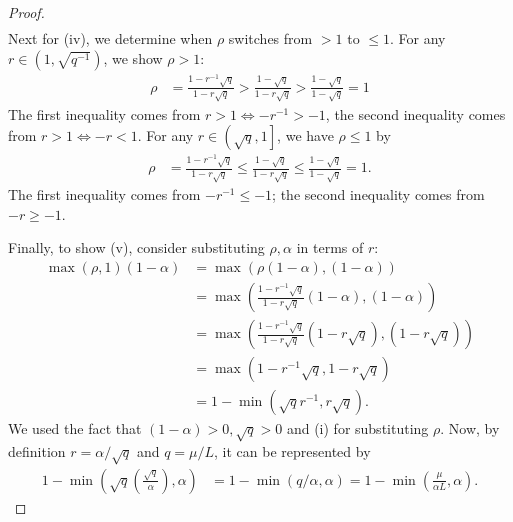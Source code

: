 \documentclass[12pt]{article}
\begin{document}
\begin{proof}
\begin{align*}
        \end{align*}
        Next for (iv), we determine when $\rho$ switches from $> 1$ to $ \le 1$.
        For any $r \in \left(1, \sqrt{q^{-1}}\right)$, we show $\rho > 1$:
        \begin{align*}
            \rho &= \frac{1 - r^{-1}\sqrt{q}}{1 - r \sqrt{q}}
            > \frac{1 - \sqrt{q}}{1 - r \sqrt{q}} > \frac{1 - \sqrt{q}}{1 - \sqrt{q}} = 1
        \end{align*}
        The first inequality comes from $r > 1 \iff -r^{-1} > -1$, the second inequality comes from $r > 1 \iff -r < 1$.
        For any $r \in \left(\sqrt{q}, 1\right]$, we have $\rho \le 1$ by
        \begin{align*}
            \rho &= \frac{1 - r^{-1}\sqrt{q}}{1 - r \sqrt{q}}
            \le \frac{1 - \sqrt{q}}{1 - r \sqrt{q}} \le \frac{1 - \sqrt{q}}{1 - \sqrt{q}} = 1.
        \end{align*}
        The first inequality comes from $-r^{-1} \le - 1$; the second inequality comes from $-r \ge -1$.
        \par
        Finally, to show (v), consider substituting $\rho, \alpha$ in terms of $r$:
        \begin{align*}
            \max(\rho, 1)(1 - \alpha) &=
            \max(\rho(1 - \alpha), (1 - \alpha))
            \\
            &= \max\left(
                \frac{1 - r^{-1}\sqrt{q}}{1 - r \sqrt{q}}(1 - \alpha), (1 - \alpha)
            \right)
            \\
            &=
            \max\left(
                \frac{1 - r^{-1}\sqrt{q}}{1 - r \sqrt{q}}(1 - r\sqrt{q}), (1 - r\sqrt{q})
            \right)
            \\
            &= \max\left(1 - r^{-1}\sqrt{q}, 1 - r \sqrt{q}\right)
            \\
            &= 1 - \min(\sqrt{q}r^{-1}, r\sqrt{q}).
        \end{align*}
        We used the fact that $(1 - \alpha) > 0, \sqrt{q} > 0$ and (i) for substituting $\rho$.
        Now, by definition $r = \alpha/\sqrt{q}$ and $q = \mu/L$, it can be represented by
        \begin{align*}
            1 - \min\left(
                \sqrt{q}\left(\frac{\sqrt{q}}{\alpha}\right), \alpha
            \right) &=
            1 - \min\left(
                q/\alpha, \alpha
            \right) =
            1 - \min\left(\frac{\mu}{\alpha L}, \alpha\right).
        \end{align*}
    \end{proof}
\end{document}
